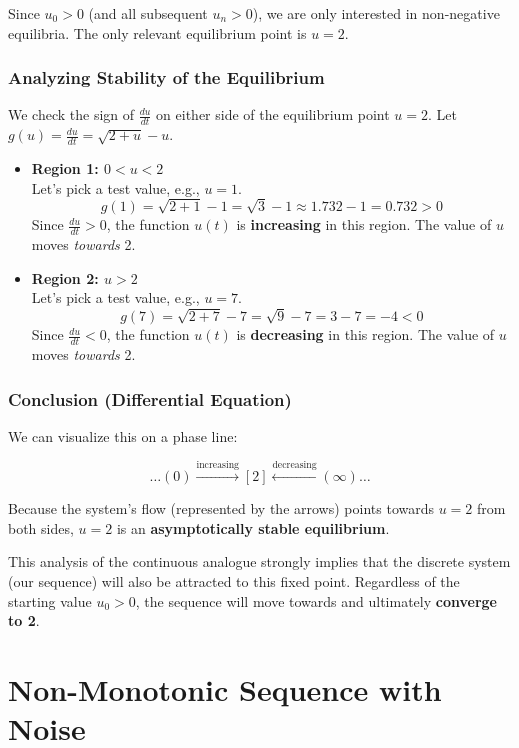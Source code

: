 \documentclass[12pt,a4paper]{article}
\theoremstyle{definition}
\begin{document}
Since $u_0 > 0$ (and all subsequent $u_n > 0$), we are only interested in non-negative equilibria. The only relevant equilibrium point is \textbf{$u = 2$}.

\subsubsection{Analyzing Stability of the Equilibrium}

We check the sign of $\frac{du}{dt}$ on either side of the equilibrium point $u=2$. Let $g(u) = \frac{du}{dt} = \sqrt{2 + u} - u$.

\begin{itemize}
    \item \textbf{Region 1: $0 < u < 2$}\\
    Let's pick a test value, e.g., $u = 1$.
    \[
    g(1) = \sqrt{2 + 1} - 1 = \sqrt{3} - 1 \approx 1.732 - 1 = 0.732 > 0
    \]
    Since $\frac{du}{dt} > 0$, the function $u(t)$ is \textbf{increasing} in this region. The value of $u$ moves \textit{towards} 2.
    
    \item \textbf{Region 2: $u > 2$}\\
    Let's pick a test value, e.g., $u = 7$.
    \[
    g(7) = \sqrt{2 + 7} - 7 = \sqrt{9} - 7 = 3 - 7 = -4 < 0
    \]
    Since $\frac{du}{dt} < 0$, the function $u(t)$ is \textbf{decreasing} in this region. The value of $u$ moves \textit{towards} 2.
\end{itemize}

\subsubsection{Conclusion (Differential Equation)}

We can visualize this on a phase line:

\[
\ldots (0) \xrightarrow{\text{increasing}} [2] \xleftarrow{\text{decreasing}} (\infty) \ldots
\]

Because the system's flow (represented by the arrows) points towards $u=2$ from both sides, $u=2$ is an \textbf{asymptotically stable equilibrium}.

This analysis of the continuous analogue strongly implies that the discrete system (our sequence) will also be attracted to this fixed point. Regardless of the starting value $u_0 > 0$, the sequence will move towards and ultimately \textbf{converge to 2}.

\section{Non-Monotonic Sequence with Noise}
\end{document}
